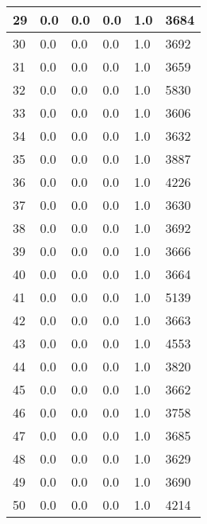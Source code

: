 \begin{longtable}{|l|l|l|l|l|l|}
29 & 0.0 & 0.0 & 0.0 & 1.0 & 3684 \\ \hline 
30 & 0.0 & 0.0 & 0.0 & 1.0 & 3692 \\ \hline 
31 & 0.0 & 0.0 & 0.0 & 1.0 & 3659 \\ \hline 
32 & 0.0 & 0.0 & 0.0 & 1.0 & 5830 \\ \hline 
33 & 0.0 & 0.0 & 0.0 & 1.0 & 3606 \\ \hline 
34 & 0.0 & 0.0 & 0.0 & 1.0 & 3632 \\ \hline 
35 & 0.0 & 0.0 & 0.0 & 1.0 & 3887 \\ \hline 
36 & 0.0 & 0.0 & 0.0 & 1.0 & 4226 \\ \hline 
37 & 0.0 & 0.0 & 0.0 & 1.0 & 3630 \\ \hline 
38 & 0.0 & 0.0 & 0.0 & 1.0 & 3692 \\ \hline 
39 & 0.0 & 0.0 & 0.0 & 1.0 & 3666 \\ \hline 
40 & 0.0 & 0.0 & 0.0 & 1.0 & 3664 \\ \hline 
41 & 0.0 & 0.0 & 0.0 & 1.0 & 5139 \\ \hline 
42 & 0.0 & 0.0 & 0.0 & 1.0 & 3663 \\ \hline 
43 & 0.0 & 0.0 & 0.0 & 1.0 & 4553 \\ \hline 
44 & 0.0 & 0.0 & 0.0 & 1.0 & 3820 \\ \hline 
45 & 0.0 & 0.0 & 0.0 & 1.0 & 3662 \\ \hline 
46 & 0.0 & 0.0 & 0.0 & 1.0 & 3758 \\ \hline 
47 & 0.0 & 0.0 & 0.0 & 1.0 & 3685 \\ \hline 
48 & 0.0 & 0.0 & 0.0 & 1.0 & 3629 \\ \hline 
49 & 0.0 & 0.0 & 0.0 & 1.0 & 3690 \\ \hline 
50 & 0.0 & 0.0 & 0.0 & 1.0 & 4214 \\ \hline 
\end{longtable}